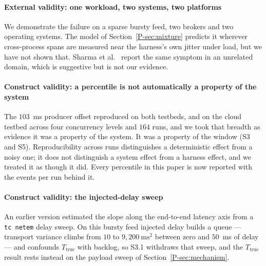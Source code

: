 \documentclass[10pt,journal,onecolumn]{IEEEtran}
\newcommand{\mainModeA}{\ref{P-sec:mechanism}}             %
\newcommand{\mainRareState}{\ref{P-sec:mixture}}       %
\begin{document}
\paragraph{External validity: one workload, two systems, two platforms} We demonstrate the
failure on a sparse bursty feed, two brokers and two operating systems. The model of
Section~\mainRareState{} predicts it wherever cross-process spans are measured near the
harness's own jitter under load, but we have not shown that. Sharma et
al.~\cite{sharma2026causality} report the same symptom in an unrelated domain, which is
suggestive but is not our evidence.

\paragraph{Construct validity: a percentile is not automatically a property of the system} The
$103$~ms producer offset reproduced on both testbeds, and on the cloud testbed across four
concurrency levels and $164$ runs,
and we took that breadth as evidence it was a property of the system. It was a property of the
window (S3 and S5). Reproducibility across runs distinguishes a deterministic
effect from a noisy one; it does not distinguish a system effect from a harness effect, and we
treated it as though it did. Every percentile in this paper is now reported with the events per
run behind it.

\paragraph{Construct validity: the injected-delay sweep} An earlier version estimated the
slope along the end-to-end latency axis from a \texttt{tc netem} delay sweep. On this bursty feed injected delay
builds a queue --- transport variance climbs from $10$ to $9{,}200~\text{ms}^2$ between zero and
$50$~ms of delay --- and confounds $T_{\mathrm{true}}$ with backlog, so S3.1 withdraws that sweep, and
the $T_{\mathrm{true}}$ result rests instead on the payload sweep of Section~\mainModeA{}.
\end{document}
